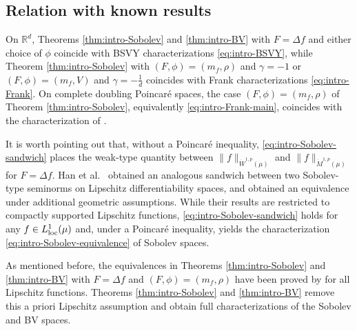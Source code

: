 \documentclass[11pt]{amsart}
\theoremstyle{definition}
\theoremstyle{remark}
\numberwithin{equation}{section}
\begin{document}
\subsection{Relation with known results}

On $\mathbb R^d$, Theorems \ref{thm:intro-Sobolev} and \ref{thm:intro-BV} with
$F=\Delta f$ and either
choice of $\phi$ coincide with BSVY characterizations \eqref{eq:intro-BSVY}, while
Theorem \ref{thm:intro-Sobolev} with
$(F,\phi)=(m_f,\rho)$ and $\gamma=-1$ or
$(F,\phi)=(m_f,V)$ and $\gamma=-\frac1d$
coincides with Frank characterizations \eqref{eq:intro-Frank}.
On complete doubling Poincar\'e spaces, the
case $(F,\phi)=(m_f,\rho)$ of Theorem \ref{thm:intro-Sobolev},
equivalently \eqref{eq:intro-Frank-main}, coincides with
the characterization of \cite[Theorem~1.6]{HK:W1p}.


It is worth pointing out that, without a Poincar\'e inequality,
\eqref{eq:intro-Sobolev-sandwich} places the weak-type quantity between
$\|f\|_{\dot W^{1,p}(\mu)}$ and $\|f\|_{\dot M^{1,p}(\mu)}$ for
$F=\Delta f$.  Han et al.\
\cite[Theorem~1.3]{HXZ} obtained an analogous sandwich between two
Sobolev-type seminorms on Lipschitz differentiability spaces, and
\cite[Corollary~1.5]{HXZ} obtained an equivalence under additional geometric
assumptions.  While their results are restricted to compactly supported Lipschitz functions,
\eqref{eq:intro-Sobolev-sandwich} holds for any $f\in L^1_{\rm loc}(\mu)$ and,
under a Poincar\'e inequality, yields the characterization
\eqref{eq:intro-Sobolev-equivalence} of Sobolev spaces.

As mentioned before, the equivalences in Theorems \ref{thm:intro-Sobolev} and
\ref{thm:intro-BV} with $F=\Delta f$ and
$(F,\phi)=(m_f,\rho)$ have been proved by \cite[Corollaries 1.9, 1.13, and~1.14]{DLYYZ} for
all
Lipschitz functions.  Theorems
\ref{thm:intro-Sobolev} and \ref{thm:intro-BV} remove this a priori
Lipschitz assumption and obtain full characterizations of the Sobolev and BV spaces.
\end{document}
